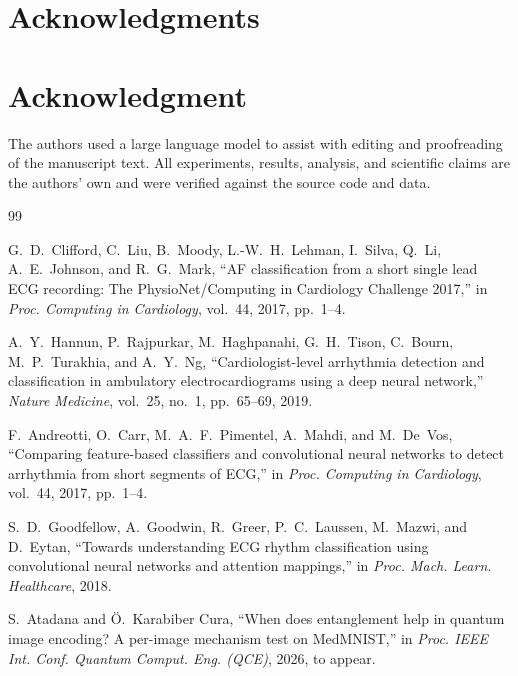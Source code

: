 \documentclass[conference,compsoc]{IEEEtran}
\begin{document}
\ifCLASSOPTIONcompsoc
  \section*{Acknowledgments}
\else
  \section*{Acknowledgment}
\fi

The authors used a large language model to assist with editing and proofreading of the manuscript text. All experiments, results, analysis, and scientific claims are the authors' own and were verified against the source code and data.

\begin{thebibliography}{99}

G.~D.~Clifford, C.~Liu, B.~Moody, L.-W.~H.~Lehman, I.~Silva, Q.~Li, A.~E.~Johnson, and R.~G.~Mark,
``{AF} classification from a short single lead {ECG} recording: The {PhysioNet}/Computing in Cardiology Challenge 2017,''
in \emph{Proc. Computing in Cardiology}, vol.~44, 2017, pp.~1--4.

A.~Y.~Hannun, P.~Rajpurkar, M.~Haghpanahi, G.~H.~Tison, C.~Bourn, M.~P.~Turakhia, and A.~Y.~Ng,
``Cardiologist-level arrhythmia detection and classification in ambulatory electrocardiograms using a deep neural network,''
\emph{Nature Medicine}, vol.~25, no.~1, pp.~65--69, 2019.

F.~Andreotti, O.~Carr, M.~A.~F.~Pimentel, A.~Mahdi, and M.~De~Vos,
``Comparing feature-based classifiers and convolutional neural networks to detect arrhythmia from short segments of {ECG},''
in \emph{Proc. Computing in Cardiology}, vol.~44, 2017, pp.~1--4.

S.~D.~Goodfellow, A.~Goodwin, R.~Greer, P.~C.~Laussen, M.~Mazwi, and D.~Eytan,
``Towards understanding {ECG} rhythm classification using convolutional neural networks and attention mappings,''
in \emph{Proc. Mach. Learn. Healthcare}, 2018.

S.~Atadana and Ö.~Karabiber Cura,
``When does entanglement help in quantum image encoding? A per-image mechanism test on {MedMNIST},''
in \emph{Proc. IEEE Int. Conf. Quantum Comput. Eng. (QCE)}, 2026, to appear.


\end{thebibliography}
\end{document}
